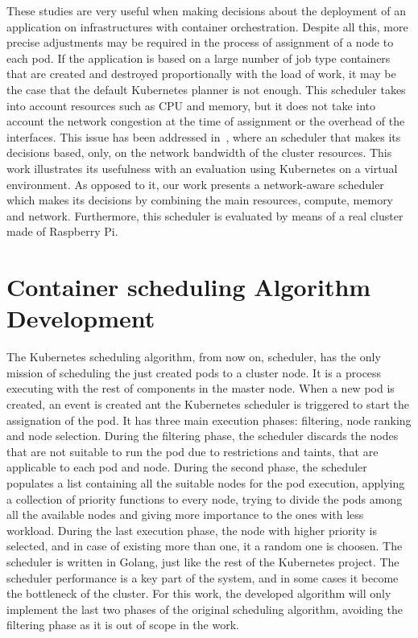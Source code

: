 \documentclass[conference]{IEEEtran}
\begin{document}
These studies are very useful when making decisions about the deployment of an application on infrastructures with container orchestration. Despite all this, more precise adjustments may be required in the process of assignment of a node to each pod. If the application is based on a large number of job type containers that are created and destroyed proportionally with the load of work, it may be the case that the default Kubernetes planner is not enough. This scheduler takes into account resources such as CPU and memory, but it does not take into account the network congestion at the time of assignment  or the overhead of the interfaces. This issue has been addressed in~\cite{Santos19}, where an scheduler that makes its decisions based, only, on the network bandwidth of the cluster resources. This work illustrates its usefulness with an evaluation using Kubernetes on a virtual environment. As opposed to it, our work presents a network-aware scheduler which makes its decisions by combining the main resources, compute, memory and network. Furthermore, this scheduler is evaluated by means of a real cluster made of Raspberry Pi. %



\section{Container scheduling Algorithm Development}\label{sec:alg}



The Kubernetes scheduling algorithm, from now on, scheduler, has the only mission of scheduling
the just created pods to a cluster node. It is a process executing with the rest of components
in the master node. When a new pod is created, an event is created ant the Kubernetes scheduler is 
triggered to start the assignation of the pod. It has three main execution phases: filtering,
node ranking and node selection. During the filtering phase, the scheduler discards the nodes
that are not suitable to run the pod due to restrictions and taints, that are applicable to each pod and node.
During the second phase, the scheduler populates a list containing all the suitable nodes for the pod execution, applying
a collection of priority functions to every node, trying to divide the pods among all the
available nodes and giving more importance to the ones with less workload. During the last execution
phase, the node with higher priority is selected, and in case of existing more than one, it a random 
one is choosen. 
The scheduler is written in Golang, just like the rest of the Kubernetes project. The scheduler
performance is a key part of the system, and in some cases it become the bottleneck of the cluster.
For this work, the developed algorithm will only implement the last two phases of the original
scheduling algorithm, avoiding the filtering phase as it is out of scope in the work.
\end{document}
